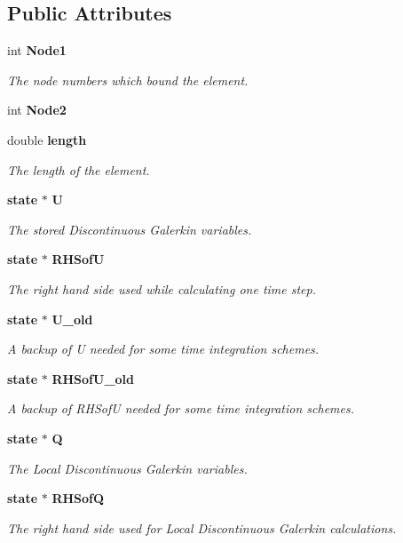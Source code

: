 \subsection*{Public Attributes}
\begin{DoxyCompactItemize}
\item 
int {\bf Node1}
\begin{DoxyCompactList}\small\item\em The node numbers which bound the element. \end{DoxyCompactList}\item 
int {\bf Node2}
\item 
double {\bf length}
\begin{DoxyCompactList}\small\item\em The length of the element. \end{DoxyCompactList}\item 
{\bf state} $\ast$ {\bf U}
\begin{DoxyCompactList}\small\item\em The stored Discontinuous Galerkin variables. \end{DoxyCompactList}\item 
{\bf state} $\ast$ {\bf R\-H\-Sof\-U}
\begin{DoxyCompactList}\small\item\em The right hand side used while calculating one time step. \end{DoxyCompactList}\item 
{\bf state} $\ast$ {\bf U\-\_\-old}
\begin{DoxyCompactList}\small\item\em A backup of U needed for some time integration schemes. \end{DoxyCompactList}\item 
{\bf state} $\ast$ {\bf R\-H\-Sof\-U\-\_\-old}
\begin{DoxyCompactList}\small\item\em A backup of R\-H\-Sof\-U needed for some time integration schemes. \end{DoxyCompactList}\item 
{\bf state} $\ast$ {\bf Q}
\begin{DoxyCompactList}\small\item\em The Local Discontinuous Galerkin variables. \end{DoxyCompactList}\item 
{\bf state} $\ast$ {\bf R\-H\-Sof\-Q}
\begin{DoxyCompactList}\small\item\em The right hand side used for Local Discontinuous Galerkin calculations. \end{DoxyCompactList}\item 

\end{DoxyCompactItemize}
